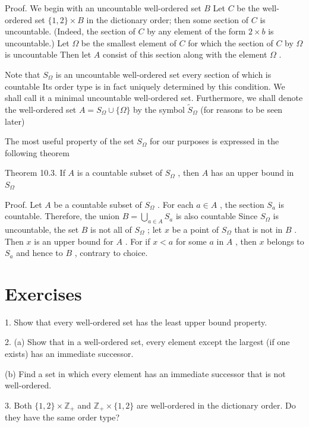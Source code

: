 Proof. We begin with an uncountable well-ordered set \(B\) Let \(C\) be the well-ordered set \(\{ 1,2\}  \times  B\) in the dictionary order; then some section of \(C\) is uncountable. (Indeed, the section of \(C\) by any element of the form \(2 \times  b\) is uncountable.) Let \(\Omega\) be the smallest element of \(C\) for which the section of \(C\) by \(\Omega\) is uncountable Then let \(A\) consist of this section along with the element \(\Omega\) .

Note that \({S}_{\Omega }\) is an uncountable well-ordered set every section of which is countable Its order type is in fact uniquely determined by this condition. We shall call it a minimal uncountable well-ordered set. Furthermore, we shall denote the well-ordered set \(A = {S}_{\Omega } \cup  \{ \Omega \}\) by the symbol \({\widetilde{S}}_{\Omega }\) (for reasons to be seen later)

The most useful property of the set \({S}_{\Omega }\) for our purposes is expressed in the following theorem

Theorem 10.3. If \(A\) is a countable subset of \({S}_{\Omega }\) , then \(A\) has an upper bound in \({S}_{\Omega }\)

Proof. Let \(A\) be a countable subset of \({S}_{\Omega }\) . For each \(a \in  A\) , the section \({S}_{a}\) is countable. Therefore, the union \(B = \mathop{\bigcup }\limits_{{a \in  A}}{S}_{a}\) is also countable Since \({S}_{\Omega }\) is uncountable, the set \(B\) is not all of \({S}_{\Omega }\) ; let \(x\) be a point of \({S}_{\Omega }\) that is not in \(B\) . Then \(x\) is an upper bound for \(A\) . For if \(x < a\) for some \(a\) in \(A\) , then \(x\) belongs to \({S}_{a}\) and hence to \(B\) , contrary to choice.

\section*{Exercises}

1. Show that every well-ordered set has the least upper bound property.

2. (a) Show that in a well-ordered set, every element except the largest (if one exists) has an immediate successor.

(b) Find a set in which every element has an immediate successor that is not well-ordered.

3. Both \(\{ 1,2\}  \times  {\mathbb{Z}}_{ + }\) and \({\mathbb{Z}}_{ + } \times  \{ 1,2\}\) are well-ordered in the dictionary order. Do they have the same order type?

